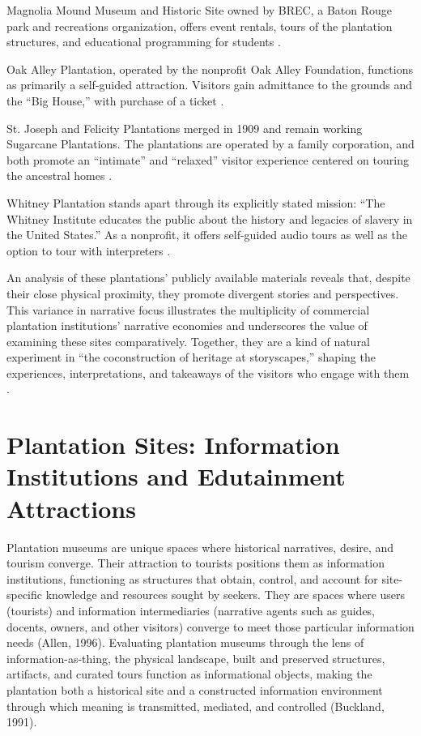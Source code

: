 \documentclass[final]{anthology-ch} %
\begin{document}
Magnolia Mound Museum and Historic Site owned by BREC, a Baton Rouge park and recreations organization, offers event rentals, tours of the plantation structures, and educational programming for students \cite{brecabout, magnoliamound}.

Oak Alley Plantation, operated by the nonprofit Oak Alley Foundation, functions as primarily a self-guided attraction. Visitors gain admittance to the grounds and the \enquote{Big House,} with purchase of a ticket \cite{oakalley}.

St. Joseph and Felicity Plantations merged in 1909 and remain working Sugarcane Plantations. The plantations are operated by a family corporation, and both promote an \enquote{intimate} and \enquote{relaxed} visitor experience centered on touring the ancestral homes \cite{stjoseph}.

Whitney Plantation stands apart through its explicitly stated mission: \enquote{The Whitney Institute educates the public about the history and legacies of slavery in the United States.} As a nonprofit, it offers self-guided audio tours as well as the option to tour with interpreters \cite{whitneyabout}.

An analysis of these plantations' publicly available materials reveals that, despite their close physical proximity, they promote divergent stories and perspectives. This variance in narrative focus illustrates the multiplicity of commercial plantation institutions' narrative economies and underscores the value of examining these sites comparatively. Together, they are a kind of natural experiment in \enquote{the coconstruction of heritage at storyscapes,} shaping the experiences, interpretations, and takeaways of the visitors who engage with them \cite{chronis2005coconstructing}.

\section{Plantation Sites: Information Institutions and Edutainment Attractions}

Plantation museums are unique spaces where historical narratives, desire, and tourism converge. Their attraction to tourists positions them as information institutions, functioning as structures that obtain, control, and account for site-specific knowledge and resources sought by seekers. They are spaces where users (tourists) and information intermediaries (narrative agents such as guides, docents, owners, and other visitors) converge to meet those particular information needs (Allen, 1996). Evaluating plantation museums through the lens of information-as-thing, the physical landscape, built and preserved structures, artifacts, and curated tours function as informational objects, making the plantation both a historical site and a constructed information environment through which meaning is transmitted, mediated, and controlled (Buckland, 1991).
\end{document}
